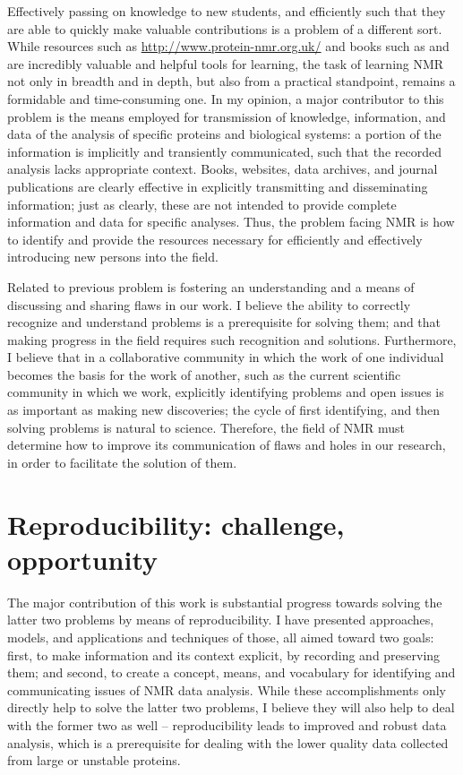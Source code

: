 Effectively passing on knowledge to new students, and efficiently such that
they are able to quickly make valuable contributions is a problem of a different
sort.  While resources such as \url{http://www.protein-nmr.org.uk/} and books
such as \cite{hoch1996nmr} and \cite{keeler2013} are incredibly valuable and
helpful tools for learning, the task of learning NMR not only in breadth and
in depth, but also from a practical standpoint, remains a formidable and
time-consuming one.  In my opinion, a major contributor to this problem is 
the means employed for transmission of knowledge, information, and data of
the analysis of specific proteins and biological systems:
a portion of the information is implicitly and transiently communicated, such 
that the recorded analysis lacks appropriate context.
Books, websites, data archives, and journal publications are clearly effective
in explicitly transmitting and disseminating information; just as clearly,
these are not intended to provide complete information and data for specific
analyses.  Thus, the problem facing
NMR is how to identify and provide the resources necessary for efficiently and
effectively introducing new persons into the field. 

Related to previous problem is fostering an understanding and a means of 
discussing and sharing flaws in our work.  I believe the ability to correctly
recognize and understand problems is a prerequisite for solving them; and that
making progress in the field requires such recognition and solutions.  
Furthermore, I believe that in a collaborative community in which the work of
one individual becomes the basis for the work of another, such as the current
scientific community in which we work, explicitly identifying problems and
open issues is as important as making new discoveries; the cycle of first
identifying, and then solving problems is natural to science.  Therefore, 
the field of NMR must determine how to improve its communication of flaws 
and holes in our research, in order to facilitate the solution of them.


\section{Reproducibility: challenge, opportunity}
The major contribution of this work is substantial progress towards solving
the latter two problems by means of reproducibility.  I have presented 
approaches, models, and applications and techniques of those, all aimed toward
two goals: first, to make information and its context explicit, by recording
and preserving them; and second, to create a concept, means, and vocabulary for
identifying and communicating issues of NMR data analysis.  While these 
accomplishments only directly help to solve the latter two problems, I believe
they will also help to deal with the former two as well -- reproducibility
leads to improved and robust data analysis, which is a prerequisite for dealing
with the lower quality data collected from large or unstable proteins.


